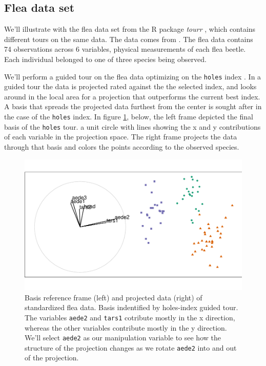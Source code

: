 \documentclass{monashthesis}
\begin{document}
\subsection{Flea data set}\label{flea-data-set}

We'll illustrate with the flea data set from the R package \emph{tourr}
\autocite{wickham_tourr_2011}, which contains different tours on the
same data. The data comes from \textcite{lubischew_use_1962}. The flea
data contains 74 observations across 6 variables, physical measurements
of each flea beetle. Each individual belonged to one of three species
being observed.

We'll perform a guided tour on the flea data optimizing on the
\texttt{holes} index \autocite{cook_interactive_2007}. In a guided tour
the data is projected rated against the the selected index, and looks
around in the local area for a projection that outperforms the current
best index. A basis that spreads the projected data furthest from the
center is sought after in the case of the \texttt{holes} index. In
figure \ref{fig:step0}, below, the left frame depicted the final basis
of the \texttt{holes} tour. a unit circle with lines showing the x and y
contributions of each variable in the projection space. The right frame
projects the data through that basis and colors the points according to
the observed species.

\begin{figure}
\centering
\includegraphics{thesis_files/figure-latex/step0-1.pdf}
\caption{\label{fig:step0}Basis reference frame (left) and projected data
(right) of standardized flea data. Basis indentified by holes-index
guided tour. The variables \texttt{aede2} and \texttt{tars1} cotribute
mostly in the x direction, whereas the other variables contribute mostly
in the y direction. We'll select \texttt{aede2} as our manipulation
variable to see how the structure of the projection changes as we rotate
\texttt{aede2} into and out of the projection.}
\end{figure}
\end{document}
